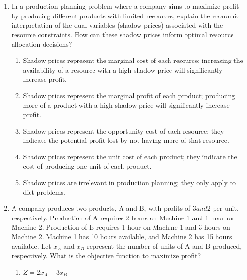 \documentclass{article}%
\begin{document}
\begin{enumerate}
\begin{enumerate}
\item The reduced cost indicates the total cost of producing one unit of that product.%
\item The reduced cost indicates the selling price of that product.%
\item The reduced cost indicates the amount of resources consumed by producing one unit of that product.%
\item The reduced cost provides no useful information in this case.%
\end{enumerate}%
\vspace{1em}%
\item In a production planning problem where a company aims to maximize profit by producing different products with limited resources, explain the economic interpretation of the dual variables (shadow prices) associated with the resource constraints. How can these shadow prices inform optimal resource allocation decisions?%
\begin{enumerate}%
\item Shadow prices represent the marginal cost of each resource; increasing the availability of a resource with a high shadow price will significantly increase profit.%
\item Shadow prices represent the marginal profit of each product; producing more of a product with a high shadow price will significantly increase profit.%
\item Shadow prices represent the opportunity cost of each resource; they indicate the potential profit lost by not having more of that resource.%
\item Shadow prices represent the unit cost of each product; they indicate the cost of producing one unit of each product.%
\item Shadow prices are irrelevant in production planning; they only apply to diet problems.%
\end{enumerate}%
\vspace{1em}%
\item A company produces two products, A and B, with profits of $3 and $2 per unit, respectively.  Production of A requires 2 hours on Machine 1 and 1 hour on Machine 2. Production of B requires 1 hour on Machine 1 and 3 hours on Machine 2. Machine 1 has 10 hours available, and Machine 2 has 15 hours available. Let $x_A$ and $x_B$ represent the number of units of A and B produced, respectively. What is the objective function to maximize profit?%
\begin{enumerate}%
\item $Z = 2x_A + 3x_B$%

\end{enumerate}
\end{enumerate}
\end{document}
